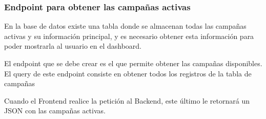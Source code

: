 \subsubsection{Endpoint para obtener las campañas activas}
En la base de datos existe una tabla donde se almacenan todas las campañas activas y su información principal, y es necesario obtener esta información para poder mostrarla al usuario en el dashboard.

El endpoint que se debe crear es el que permite obtener las campañas disponibles. El query de este endpoint consiste en obtener todos los registros de la tabla de campañas

Cuando el Frontend realice la petición al Backend, este último le retornará un JSON con las campañas activas.